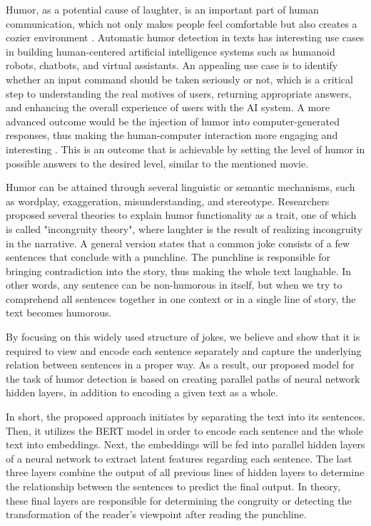 \documentclass{article}
\begin{document}
Humor, as a potential cause of laughter, is an important part of human communication, which not only makes people feel comfortable but also creates a cozier environment \cite{castro2016joke}. Automatic humor detection in texts has interesting use cases in building human-centered artificial intelligence systems such as humanoid robots, chatbots, and virtual assistants. An appealing use case is to identify whether an input command should be taken seriously or not, which is a critical step to understanding the real motives of users, returning appropriate answers, and enhancing the overall experience of users with the AI system. A more advanced outcome would be the injection of humor into computer-generated responses, thus making the human-computer interaction more engaging and interesting \cite{niculescu2013making}. This is an outcome that is achievable by setting the level of humor in possible answers to the desired level, similar to the mentioned movie.

Humor can be attained through several linguistic or semantic mechanisms, such as wordplay, exaggeration, misunderstanding, and stereotype. Researchers proposed several theories to explain humor functionality as a trait, one of which is called "incongruity theory", where laughter is the result of realizing incongruity in the narrative. A general version states that a common joke consists of a few sentences that conclude with a punchline. The punchline is responsible for bringing contradiction into the story, thus making the whole text laughable. In other words, any sentence can be non-humorous in itself, but when we try to comprehend all sentences together in one context or in a single line of story, the text becomes humorous. 

By focusing on this widely used structure of jokes, we believe and show that it is required to view and encode each sentence separately and capture the underlying relation between sentences in a proper way. As a result, our proposed model for the task of humor detection is based on creating parallel paths of neural network hidden layers, in addition to encoding a given text as a whole.

In short, the proposed approach initiates by separating the text into its sentences. Then, it utilizes the BERT model in order to encode each sentence and the whole text into embeddings. Next, the embeddings will be fed into parallel hidden layers of a neural network to extract latent features regarding each sentence. The last three layers combine the output of all previous lines of hidden layers to determine the relationship between the sentences to predict the final output. In theory, these final layers are responsible for determining the congruity or detecting the transformation of the reader's viewpoint after reading the punchline.
\end{document}
